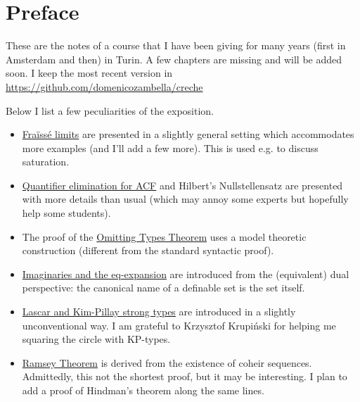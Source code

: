\documentclass[creche.tex]{subfiles}
\begin{document}
\chapter*{Preface}
\label{praface}

These are the notes of a course that I have been giving for many years (first in Amsterdam and then) in Turin. A few chapters are missing and will be added soon. I keep the most recent version in
\url{https://github.com/domenicozambella/creche}


Below I list a few peculiarities of the exposition.

\begin{itemize}
\item \hyperref[rich]{Fraïssé limits} are presented in a slightly general setting which accommodates more examples (and I'll add a few more). This is used e.g. to discuss saturation.
\item \hyperref[algebraic]{Quantifier elimination for ACF} and Hilbert's Nullstellensatz are presented with more details than usual (which may annoy some experts but hopefully help some students).
\item The proof of the \hyperref[countable]{Omitting Types Theorem} uses a model theoretic construction (different from the standard syntactic proof).
\item \hyperref[imaginary]{Imaginaries and the eq-expansion} are introduced from the (equivalent) dual perspective: the canonical name of a definable set is the set itself.
\item \hyperref[invariantL]{Lascar and Kim-Pillay strong types} are introduced in a slightly unconventional way. I am grateful to Krzysztof Krupiński for helping me squaring the circle with KP-types.
\item \hyperref[Ramsey]{Ramsey Theorem} is derived from the existence of coheir sequences. Admittedly, this not the shortest proof, but it may be interesting. I plan to add a proof of Hindman's theorem along the same lines.
\end{itemize}
\end{document}
